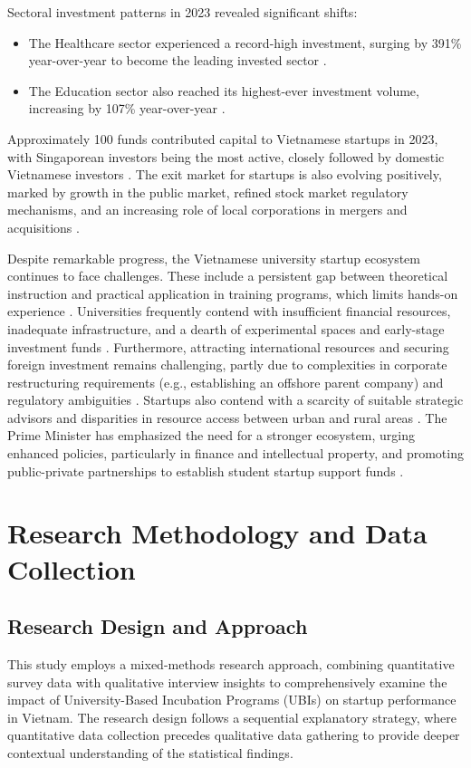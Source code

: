 \documentclass[../Main.tex]{subfiles}%
\begin{document}
	Sectoral investment patterns in 2023 revealed significant shifts:
	\begin{itemize}
	\item The Healthcare sector experienced a record-high investment, surging by 391\% year-over-year to become the leading invested sector \autocite{vietnam_innovation_report_2024}.
	\item The Education sector also reached its highest-ever investment volume, increasing by 107\% year-over-year \autocite{vietnam_innovation_report_2024}.
	\end{itemize}
	Approximately 100 funds contributed capital to Vietnamese startups in 2023, with Singaporean investors being the most active, closely followed by domestic Vietnamese investors \autocite{vietnam_innovation_report_2024}. The exit market for startups is also evolving positively, marked by growth in the public market, refined stock market regulatory mechanisms, and an increasing role of local corporations in mergers and acquisitions \autocite{vietnam_innovation_report_2024}.

	Despite remarkable progress, the Vietnamese university startup ecosystem continues to face challenges. These include a persistent gap between theoretical instruction and practical application in training programs, which limits hands-on experience \autocite{nhandan2025startup}. Universities frequently contend with insufficient financial resources, inadequate infrastructure, and a dearth of experimental spaces and early-stage investment funds \autocite{nhandan2025startup}. Furthermore, attracting international resources and securing foreign investment remains challenging, partly due to complexities in corporate restructuring requirements (e.g., establishing an offshore parent company) and regulatory ambiguities \autocite{bssc2025wave, nssc2024challenges}. Startups also contend with a scarcity of suitable strategic advisors and disparities in resource access between urban and rural areas \autocite{ueh2024vc}. The Prime Minister has emphasized the need for a stronger ecosystem, urging enhanced policies, particularly in finance and intellectual property, and promoting public-private partnerships to establish student startup support funds \autocite{vietnamnews2025pm}.

	\section{Research Methodology and Data Collection}
	
	\subsection{Research Design and Approach}
	This study employs a mixed-methods research approach, combining quantitative survey data with qualitative interview insights to comprehensively examine the impact of University-Based Incubation Programs (UBIs) on startup performance in Vietnam. The research design follows a sequential explanatory strategy, where quantitative data collection precedes qualitative data gathering to provide deeper contextual understanding of the statistical findings.
	
\end{document}
